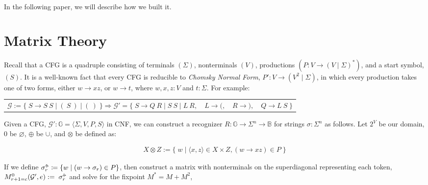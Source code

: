 \documentclass[sigplan,review,anonymous,acmsmall]{acmart}\settopmatter{printfolios=false,printccs=false,printacmref=false}
\begin{document}
\noindent In the following paper, we will describe how we built it.

\section{Matrix Theory}\label{sec:matrix}

Recall that a CFG is a quadruple consisting of terminals $(\Sigma)$, nonterminals $(V)$, productions $(P\colon V \rightarrow (V \mid \Sigma)^*)$, and a start symbol, $(S)$. It is a well-known fact that every CFG is reducible to \textit{Chomsky Normal Form}, $P'\colon V \rightarrow (V^2 \mid \Sigma)$, in which every production takes one of two forms, either $w \rightarrow xz$, or $w \rightarrow t$, where $w, x, z: V$ and $t: \Sigma$. For example:\vspace{-3pt}

\begin{table}[H]
\begin{tabular}{llll}
$\mathcal{G}:=\big\{\;S \rightarrow S\:S \mid (\:S\:) \mid (\:)\;\big\} \Longrightarrow \mathcal{G}'=\big\{\;S\rightarrow Q\:R \mid S\:S \mid L\:R,$ & $L \rightarrow (,$ & $R \rightarrow ),$ & $Q\rightarrow L\:S\;\big\}$
\end{tabular}
\end{table}\vspace{-8pt}

\noindent Given a CFG, $\mathcal{G}' : \mathbb{G} = \langle \Sigma, V, P, S\rangle$ in CNF, we can construct a recognizer $R: \mathbb{G} \rightarrow \Sigma^n \rightarrow \mathbb{B}$ for strings $\sigma: \Sigma^n$ as follows. Let $2^V$ be our domain, $0$ be $\varnothing$, $\oplus$ be $\cup$, and $\otimes$ be defined as:\vspace{-10pt}

\begin{align}
X \otimes Z := \big\{\;w \mid \langle x, z\rangle \in X \times Z, (w\rightarrow xz) \in P\;\big\}
\end{align}

\noindent If we define $\sigma_r^{\shortuparrow\hspace{-5pt}\shortrightarrow} \coloneqq \{w \mid (w \rightarrow \sigma_r) \in P\}$, then construct a matrix with nonterminals on the superdiagonal representing each token, $M^0_{r+1=c}(\mathcal{G}', e) := \;\sigma_r^{\shortuparrow\hspace{-5pt}\shortrightarrow}$ and solve for the fixpoint $M^* = M + M^2$,\vspace{-10pt}
\end{document}
